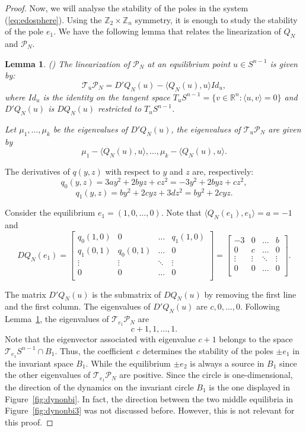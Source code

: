 \documentclass{article}
\newtheorem{lem}{Lemma}
\theoremstyle{definition}
\begin{document}
\begin{proof}
Now, we will analyse the stability of the poles in the system (\ref{eq:edosphere}).
Using the $\mathbb{Z}_2\times\mathbb{Z}_n$ symmetry, it is enough to study the stability of the pole $e_1$.
We have the following lemma that relates the linearization of $Q_N$ and $\mathcal{P}_N$.

\begin{lem}\label{lem:spherelinear}(\cite[Lemma 4.6.2]{F07})
The linearization of $\mathcal{P}_N$ at an equilibrium point $u\in S^{n-1}$ is given by:
$$\mathcal{T}_u\mathcal{P}_N=D'Q_N(u)-\langle Q_N(u),u\rangle Id_u,$$
where $Id_u$ is the identity on the tangent space $T_u S^{n-1}=\{v\in\mathbb{R}^n: \langle u,v\rangle=0\}$ and $D'Q_N(u)$ is $DQ_N(u)$ restricted to $T_u S^{n-1}$.

Let $\mu_1,\dots,\mu_k$ be the eigenvalues of $D'Q_N(u)$, the eigenvalues of $\mathcal{T}_u\mathcal{P}_N$ are given by 
$$\mu_1-\langle Q_N(u),u\rangle,\dots, \mu_k-\langle Q_N(u),u\rangle.$$
\end{lem}


The derivatives of $q(y,z)$ with respect to $y$ and $z$ are, respectively:
$$q_0(y,z)=3a y^2+2b yz+c z^2=-3 y^2+2b yz+c z^2,$$
$$q_1(y,z)=b y^2+2c yz+3d z^2=b y^2+2c yz.$$

Consider the equilibrium $e_1=(1,0,\dots,0)$. Note that $\langle Q_N(e_1),e_1\rangle=a=-1$ and
\begin{equation}\label{eq:DQNu1}
DQ_N(e_1)=
\begin{bmatrix}
q_0(1,0)&0&\dots&q_1(1,0)\\
q_1(0,1)&q_0(0,1)&\dots&0\\
\vdots & \vdots&\ddots&\vdots\\
0&0&\dots&0\\
\end{bmatrix}=\begin{bmatrix}
-3&0&\dots&b\\
0&c&\dots&0\\
\vdots & \vdots&\ddots&\vdots\\
0&0&\dots&0\\
\end{bmatrix}.
\end{equation}

The matrix $D'Q_N(u)$ is the submatrix of $DQ_N(u)$ by removing the first line and the first column.
The eigenvalues of $D'Q_N(u)$ are $c,0,\dots,0$.
Following Lemma~\ref{lem:spherelinear}, the eigenvalues of $\mathcal{T}_{e_1}\mathcal{P}_N$ are
$$c+1,1,\dots,1.$$
Note that the eigenvector associated with eigenvalue $c+1$ belongs to the space $\mathcal{T}_{e_1} S^{n-1}\cap B_1$.
Thus, the coefficient $c$ determines the stability of the poles $\pm e_1$ in the invariant space $B_1$.
While the equilibrium $\pm e_2$ is always a source in $B_1$ since the other eigenvalues of $\mathcal{T}_{e_1}\mathcal{P}_N$ are positive.
Since the circle is one-dimensional, the direction of the dynamics on the invariant circle $B_1$ is the one displayed in Figure~\ref{fig:dynonbi}.
In fact, the direction between the two middle equilibria in Figure~\ref{fig:dynonbi3} was not discussed before. 
However, this is not relevant for this proof.
\end{proof}
\end{document}
